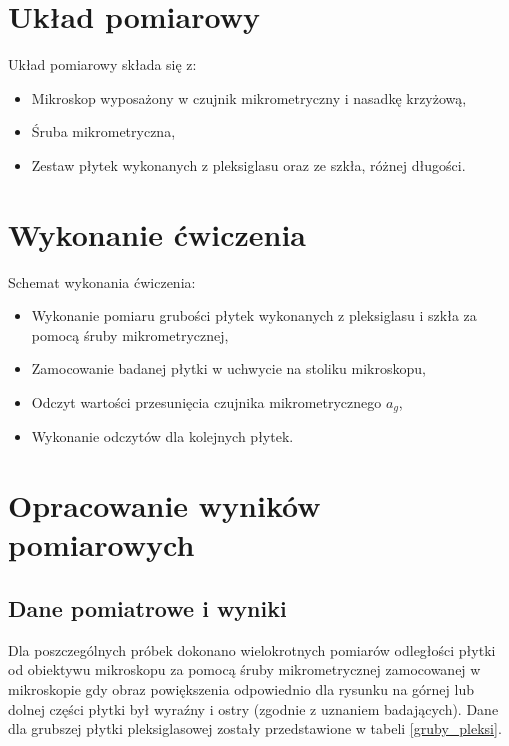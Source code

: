 \documentclass[a4paper,12pts]{article}
\begin{document}
	\newpage
	\section{Układ pomiarowy}
	
	Układ pomiarowy składa się z:
	
	\begin{itemize}
		\item Mikroskop wyposażony w czujnik mikrometryczny i nasadkę krzyżową,
		\item Śruba mikrometryczna,
		\item Zestaw płytek wykonanych z pleksiglasu oraz ze szkła, różnej długości.
	\end{itemize}
	
	
	\section{Wykonanie ćwiczenia}
	
	Schemat wykonania ćwiczenia:
	
	\begin{itemize}
		\item Wykonanie pomiaru grubości płytek wykonanych z pleksiglasu i szkła za pomocą śruby mikrometrycznej,
		\item Zamocowanie badanej płytki w uchwycie na stoliku mikroskopu,
		\item Odczyt wartości przesunięcia czujnika mikrometrycznego $a_g$,
		\item Wykonanie odczytów dla kolejnych płytek.
	\end{itemize}
	
	
	\section{Opracowanie wyników pomiarowych}
	\subsection{Dane pomiatrowe i wyniki}
	Dla poszczególnych próbek dokonano wielokrotnych pomiarów odległości płytki od obiektywu mikroskopu za pomocą śruby mikrometrycznej zamocowanej w mikroskopie gdy obraz powiększenia odpowiednio dla rysunku na górnej lub dolnej części płytki był wyraźny i ostry (zgodnie z uznaniem badających). Dane dla grubszej płytki pleksiglasowej zostały przedstawione w tabeli \ref{gruby_pleksi}.
	
\end{document}
